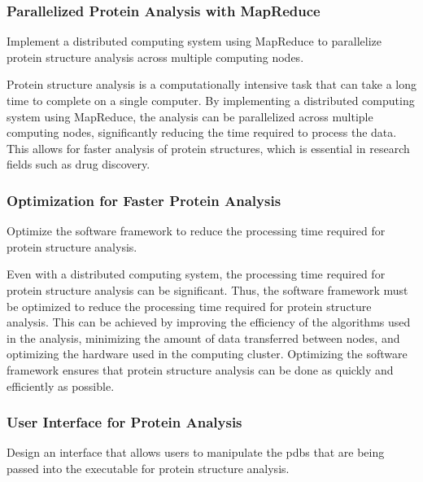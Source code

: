 \documentclass[]{final_report}
\begin{document}
\subsubsection{Parallelized Protein Analysis with MapReduce}

\begin{displayquote}
    Implement a distributed computing system using MapReduce to parallelize protein structure analysis across multiple computing nodes.
\end{displayquote}

Protein structure analysis is a computationally intensive task that can take a long time to complete on a single computer. By implementing a distributed computing system using MapReduce, the analysis can be parallelized across multiple computing nodes, significantly reducing the time required to process the data. This allows for faster analysis of protein structures, which is essential in research fields such as drug discovery.

\subsubsection{Optimization for Faster Protein Analysis}

\begin{displayquote}
    Optimize the software framework to reduce the processing time required for protein structure analysis.
\end{displayquote}

Even with a distributed computing system, the processing time required for protein structure analysis can be significant. Thus, the software framework must be optimized to reduce the processing time required for protein structure analysis. This can be achieved by improving the efficiency of the algorithms used in the analysis, minimizing the amount of data transferred between nodes, and optimizing the hardware used in the computing cluster. Optimizing the software framework ensures that protein structure analysis can be done as quickly and efficiently as possible.
\clearpage

\subsubsection{User Interface for Protein Analysis}

\begin{displayquote}
    Design an interface that allows users to manipulate the pdbs that are being passed into the executable for protein structure analysis.
\end{displayquote}
\end{document}
